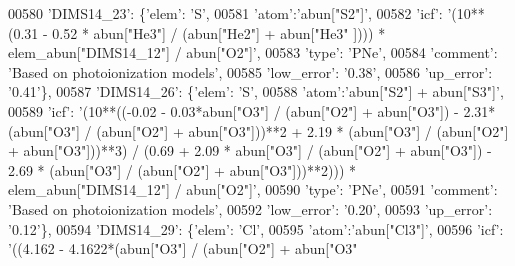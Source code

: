 \begin{DoxyCode}
00580                          \textcolor{stringliteral}{'DIMS14\_23'}: \{\textcolor{stringliteral}{'elem'}: \textcolor{stringliteral}{'S'},
00581                                        \textcolor{stringliteral}{'atom'}:\textcolor{stringliteral}{'abun["S2"]'}, 
00582                                        \textcolor{stringliteral}{'icf'}: \textcolor{stringliteral}{'(10**(0.31 - 0.52 * abun["He3"] / (abun["He2"] + abun["He3"
      ]))) * elem\_abun["DIMS14\_12"] / abun["O2"]'},
00583                                        \textcolor{stringliteral}{'type'}: \textcolor{stringliteral}{'PNe'},
00584                                        \textcolor{stringliteral}{'comment'}: \textcolor{stringliteral}{'Based on photoionization models'},
00585                                        \textcolor{stringliteral}{'low\_error'}: \textcolor{stringliteral}{'0.38'},
00586                                        \textcolor{stringliteral}{'up\_error'}: \textcolor{stringliteral}{'0.41'}\},
00587                          \textcolor{stringliteral}{'DIMS14\_26'}: \{\textcolor{stringliteral}{'elem'}: \textcolor{stringliteral}{'S'},
00588                                        \textcolor{stringliteral}{'atom'}:\textcolor{stringliteral}{'abun["S2"] + abun["S3"]'}, 
00589                                        \textcolor{stringliteral}{'icf'}: \textcolor{stringliteral}{'(10**((-0.02 - 0.03*abun["O3"] / (abun["O2"] + abun["O3"]) -
       2.31*(abun["O3"] / (abun["O2"] + abun["O3"]))**2 + 2.19 * (abun["O3"] / (abun["O2"] + abun["O3"]))**3) /
       (0.69 + 2.09 * abun["O3"] / (abun["O2"] + abun["O3"]) - 2.69 * (abun["O3"] / (abun["O2"] + abun["O3"]))**2)))
       * elem\_abun["DIMS14\_12"] / abun["O2"]'},
00590                                        \textcolor{stringliteral}{'type'}: \textcolor{stringliteral}{'PNe'},
00591                                        \textcolor{stringliteral}{'comment'}: \textcolor{stringliteral}{'Based on photoionization models'},
00592                                        \textcolor{stringliteral}{'low\_error'}: \textcolor{stringliteral}{'0.20'},
00593                                        \textcolor{stringliteral}{'up\_error'}: \textcolor{stringliteral}{'0.12'}\},
00594                          \textcolor{stringliteral}{'DIMS14\_29'}: \{\textcolor{stringliteral}{'elem'}: \textcolor{stringliteral}{'Cl'},
00595                                        \textcolor{stringliteral}{'atom'}:\textcolor{stringliteral}{'abun["Cl3"]'}, 
00596                                        \textcolor{stringliteral}{'icf'}: \textcolor{stringliteral}{'((4.162 - 4.1622*(abun["O3"] / (abun["O2"] + abun["O3"
}
\end{DoxyCode}
